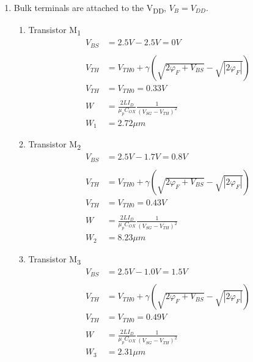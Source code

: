 \documentclass{article}
\begin{document}
\begin{enumerate}
\item Bulk terminals are attached to the V\textsubscript{DD}, \(V_{B} = V_{DD}\).
\begin{enumerate}
\item Transistor M\textsubscript{1}
\begin{equation*}
\begin{align}
V_{BS} &= 2.5 V - 2.5 V = 0 V \\
\\
V_{TH} &= V_{TH0} + \gamma{}(\sqrt{2\varphi_{F} + V_{BS}} - \sqrt{|2\varphi_{F}|}) \\
V_{TH} &= V_{TH0} = 0.33 V \\
\\
W &= \frac{2LI_{D}}{\mu_{p}C_{OX}}\frac{1}{(V_{SG} - V_{TH})^{2}} \\
W_{1} &= 2.72 \mu{}m
\end{align}
\end{equation*}

\item Transistor M\textsubscript{2}
\begin{equation*}
\begin{align}
V_{BS} &= 2.5 V - 1.7 V = 0.8 V \\
\\
V_{TH} &= V_{TH0} + \gamma{}(\sqrt{2\varphi_{F} + V_{BS}} - \sqrt{|2\varphi_{F}|}) \\
V_{TH} &= V_{TH0} = 0.43 V \\
\\
W &= \frac{2LI_{D}}{\mu_{p}C_{OX}}\frac{1}{(V_{SG} - V_{TH})^{2}} \\
W_{2} &= 8.23 \mu{}m
\end{align}
\end{equation*}

\item Transistor M\textsubscript{3}
\begin{equation*}
\begin{align}
V_{BS} &= 2.5 V - 1.0 V = 1.5 V \\
\\
V_{TH} &= V_{TH0} + \gamma{}(\sqrt{2\varphi_{F} + V_{BS}} - \sqrt{|2\varphi_{F}|}) \\
V_{TH} &= V_{TH0} = 0.49 V \\
\\
W &= \frac{2LI_{D}}{\mu_{p}C_{OX}}\frac{1}{(V_{SG} - V_{TH})^{2}} \\
W_{3} &= 2.31 \mu{}m
\end{align}
\end{equation*}
\end{enumerate}
\end{enumerate}
\end{document}
